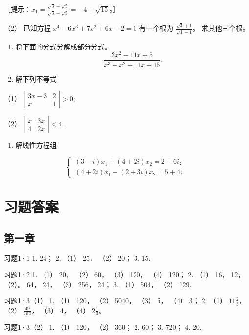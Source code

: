 ［提示：\(x_1=\frac{\sqrt3-\sqrt5}{\sqrt3+\sqrt5}=-4+\sqrt{15}\)。］

（2） 已知方程 \(x^4 - 6x^3 + 7x^2 + 6x - 2 = 0\) 有一个根为
\(\frac{\sqrt{3} + 1}{\sqrt{3} - 1}\)。 求其他三个根。

\begin{enumerate}[start=10]
\item
  将下面的分式分解成部分分式。
\[
\frac {2 x ^ {2} - 11 x + 5}{x ^ {3} - x ^ {2} - 11 x + 15}.
\]
\item
  解下列不等式
\end{enumerate}

（1）
\(\left| \begin{array}{cc}3x - 3 & 2\\ x & 1 \end{array} \right| > 0;\)

（2）
\(\left| \begin{array}{cc} x & 3x \\ 4 & 2x \end{array} \right| < 4.\)

\begin{enumerate}[start=12]
\item
  解线性方程组
\end{enumerate}

\[
\left\{ \begin{array}{l} (3 - i) x _ {1} + (4 + 2 i) x _ {2} = 2 + 6 i\text{，} \\ (4 + 2 i) x _ {1} - (2 + 3 i) x _ {2} = 5 + 4 i. \end{array} \right.
\]

\chapter{习题答案}

\section{第一章}

习题1·1 1. 24； 2. （1） 25， （2） 20； 3. 15.

习题1·2 1. （1） 20， （2） 60， （3） 120， （4） 120； 2. （1） 16，
12， （2）。 64， 24， （3） 256， 24； 3. （1） 504， （2） 729.

习题1·3（1） 1. （1） 120， （2） 5040， （3） 5， （4） 3； 2. （1）
\(11\frac{2}{3}\)， （2） \(\frac{49}{792}\)， （3） 4， （4）
\(2\frac{1}{3}\)。

习题1·3（2） 1. （1） 120， （2） 360； 2. 60； 3. 720； 4. 20.


